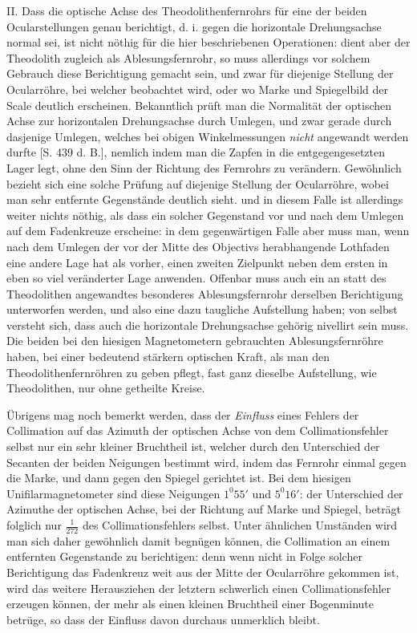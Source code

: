 II. Dass die optische Achse des Theodolithenfernrohrs für eine der beiden Ocularstellungen genau berichtigt, d. i. gegen die horizontale Drehungsachse normal sei, ist nicht nöthig für die hier beschriebenen Operationen: dient aber der Theodolith zugleich als Ablesungsfernrohr, so muss allerdings vor solchem Gebrauch diese Berichtigung gemacht sein, und zwar für diejenige Stellung der Ocularröhre, bei welcher beobachtet wird, oder wo Marke und Spiegelbild der Scale deutlich erscheinen. Bekanntlich prüft man die Normalität der optischen Achse zur horizontalen Drehungsachse durch Umlegen, und zwar gerade durch dasjenige Umlegen, welches bei obigen Winkelmessungen \textit{nicht} angewandt werden durfte [S. 439 d. B.], nemlich indem man die Zapfen in die entgegengesetzten Lager legt, ohne den Sinn der Richtung des Fernrohrs zu verändern. Gewöhnlich bezieht sich eine solche Prüfung auf diejenige Stellung der Ocularröhre, wobei man sehr entfernte Gegenstände deutlich sieht. und in diesem Falle ist allerdings weiter nichts nöthig, als dass ein solcher Gegenstand vor und nach dem Umlegen auf dem Fadenkreuze erscheine: in dem gegenwärtigen Falle aber muss man, wenn nach dem Umlegen der vor der Mitte des Objectivs herabhangende Lothfaden eine andere Lage hat als vorher, einen zweiten Zielpunkt neben dem ersten in eben so viel veränderter Lage anwenden. Offenbar muss auch ein an%
%
statt des Theodolithen angewandtes besonderes Ablesungsfernrohr derselben Berichtigung unterworfen werden, und also eine dazu taugliche Aufstellung haben; von selbst versteht sich, dass auch die horizontale Drehungsachse gehörig nivellirt sein muss. Die beiden bei den hiesigen Magnetometern gebrauchten Ablesungsfernröhre haben, bei einer bedeutend stärkern optischen Kraft, als man den Theodolithenfernröhren zu geben pflegt, fast ganz dieselbe Aufstellung, wie Theodolithen, nur ohne getheilte Kreise.

Übrigens mag noch bemerkt werden, dass der \textit{Einfluss} eines Fehlers der Collimation auf das Azimuth der optischen Achse von dem Collimationsfehler selbst nur ein sehr kleiner Bruchtheil ist, welcher durch den Unterschied der Secanten der beiden Neigungen bestimmt wird, indem das Fernrohr einmal gegen die Marke, und dann gegen den Spiegel gerichtet ist. Bei dem hiesigen Unifilarmagnetometer sind diese Neigungen $1^0 55'$ und $5^0 16'$: der Unterschied der Azimuthe der optischen Achse, bei der Richtung auf Marke und Spiegel, beträgt folglich nur $\frac{1}{272}$ des Collimationsfehlers selbst. Unter ähnlichen Umständen wird man sich daher gewöhnlich damit begnügen können, die Collimation an einem entfernten Gegenstande zu berichtigen: denn wenn nicht in Folge solcher Berichtigung das Fadenkreuz weit aus der Mitte der Ocularröhre gekommen ist, wird das weitere Herausziehen der letztern schwerlich einen Collimationsfehler erzeugen können, der mehr als einen kleinen Bruchtheil einer Bogenminute betrüge, so dass der Einfluss davon durchaus unmerklich bleibt.

